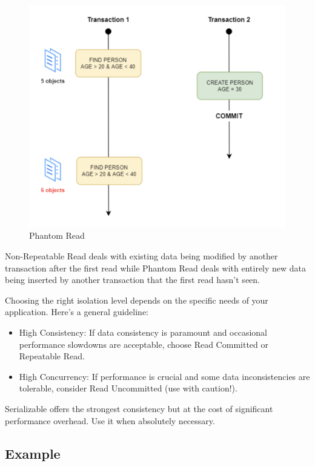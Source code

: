 \begin{figure}[H]
  \includegraphics[width=\linewidth]{images/chapter-jdbc/phantom_read.png}
  \caption{Phantom Read}
  \label{fig:paths}
\end{figure}


Non-Repeatable Read deals with existing data being modified by another transaction after the first read while Phantom Read deals with entirely new data being inserted by another transaction that the first read hasn't seen.

Choosing the right isolation level depends on the specific needs of your application. Here's a general guideline:

\begin{itemize}
\item High Consistency: If data consistency is paramount and occasional performance slowdowns are acceptable, choose Read Committed or Repeatable Read.

\item High Concurrency: If performance is crucial and some data inconsistencies are tolerable, consider Read Uncommitted (use with caution!).
\end{itemize}

Serializable offers the strongest consistency but at the cost of significant performance overhead. Use it when absolutely necessary.


\subsection{Example}

